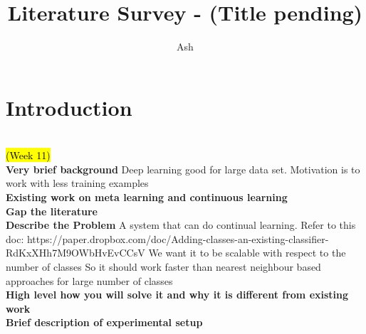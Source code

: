 \documentclass{report}
\title{Literature Survey - (Title pending)}
\author{Ash}
\newcommand{\TODO}[1]{\sethlcolor{pink}\hl{\\(#1)\\}}
\begin{document}
	\maketitle
	\thispagestyle{empty}
	\newpage
	\thispagestyle{empty}
	\tableofcontents
	\newpage
	\thispagestyle{empty}
	\listoffigures
	\newpage
	
	\chapter{Introduction}
	\TODO{Week 11}
	\textbf{Very brief background}
	Deep learning good for large data set.
	Motivation is to work with less training examples \\
	\textbf{Existing work on meta learning and continuous learning} \\
	\textbf{Gap the literature} \\
	\textbf{Describe the Problem}
	A system that can do continual learning. Refer to this doc:
	https://paper.dropbox.com/doc/Adding-classes-an-existing-classifier-RdKxXHh7M9OWbHvEvCCsV
	We want it to be scalable with respect to the number of classes
	So it should work faster than nearest neighbour based approaches for large number of classes \\
	\textbf{High level how you will solve it and why it is different from existing work} \\
	\textbf{Brief description of experimental setup} \\
	
	
\end{document}
